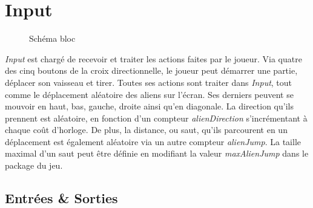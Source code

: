 \documentclass[french]{nakrule}
\begin{document}
\clearpage

\section{Input}
\label{sec:input}


\begin{figure}
\caption{Schéma bloc}
\label{inputBloc}
\end{figure}

\emph{Input} est chargé de recevoir et traiter les actions faites par le joueur.
Via quatre des cinq boutons de la croix directionnelle, le joueur peut démarrer
une partie, déplacer son vaisseau et tirer. Toutes ses actions sont traiter dans
\emph{Input}, tout comme le déplacement aléatoire des aliens sur l'écran. Ses
derniers peuvent se mouvoir en haut, bas, gauche, droite ainsi qu'en diagonale.
La direction qu'ils prennent est aléatoire, en fonction d'un compteur
\emph{alienDirection} s'incrémentant à chaque coût d'horloge. De plus, la
distance, ou saut, qu'ils parcourent en un déplacement est également aléatoire
via un autre compteur \emph{alienJump}. La taille maximal d'un saut peut être
définie en modifiant la valeur \emph{maxAlienJump} dans le package du jeu.



\subsection{Entrées \& Sorties}
\label{subsec:Entrées_Sorties_input}
\end{document}
